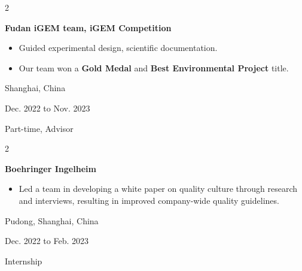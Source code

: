 \documentclass[10pt, letterpaper]{article}
\newenvironment{highlights}{
    \begin{itemize}[
        topsep=0.10 cm,
        parsep=0.10 cm,
        partopsep=0pt,
        itemsep=0pt,
        leftmargin=0.4 cm + 10pt
    ]
}{
    \end{itemize}
} %
\newenvironment{twocolentry}[2][]{
    \onecolentry
    \def\secondColumn{#2}
    \setcolumnwidth{\fill, 4.5 cm}
    \begin{paracol}{2}
}{
    \switchcolumn \raggedleft \secondColumn
    \end{paracol}
    \endonecolentry
} %
\let\hrefWithoutArrow\href
\renewcommand{\href}[2]{\hrefWithoutArrow{#1}{\mbox{\ifthenelse{\equal{#2}{}}{ }{#2 }\raisebox{.15ex}{\footnotesize \faExternalLink*}}}}
\begin{document}
\begin{twocolentry}{
    Shanghai, China

    Dec. 2022 to Nov. 2023

    Part-time, Advisor
}
    \textbf{Fudan iGEM team, iGEM Competition}
    \quad \href{https://2023.igem.wiki/fudan/}{\faGlobe}
    \begin{highlights}
        \item Guided experimental design, scientific documentation.
        \item Our team won a\textbf{ Gold Medal }and \textbf{Best Environmental Project }title.
    \end{highlights}
    
\end{twocolentry}


\begin{twocolentry}{
    Pudong, Shanghai, China

    Dec. 2022 to Feb. 2023

    Internship
}
    \textbf{Boehringer Ingelheim}
    \begin{highlights}
        \item Led a team in developing a white paper on quality culture through research and interviews, resulting in improved company-wide quality guidelines.
    \end{highlights}
\end{twocolentry}
\end{document}
